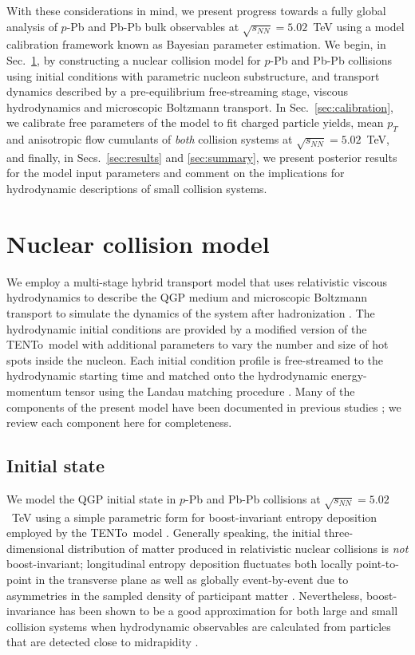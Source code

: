 \documentclass[aps,prc,reprint,amsmath,nofootinbib]{revtex4-1}
\newcommand{\trento}{T\raisebox{-0.5ex}{R}ENTo}
\newcommand{\sqrts}{\sqrt{s_{NN}}}
\begin{document}
With these considerations in mind, we present progress towards a fully global analysis of $p$-Pb and Pb-Pb bulk observables at $\sqrts=5.02$~TeV using a model calibration framework known as Bayesian parameter estimation.
We begin, in Sec.~\ref{sec:model}, by constructing a nuclear collision model for $p$-Pb and Pb-Pb collisions using initial conditions with parametric nucleon substructure, and transport dynamics described by a pre-equilibrium free-streaming stage, viscous hydrodynamics and microscopic Boltzmann transport.
In Sec.~\ref{sec:calibration}, we calibrate free parameters of the model to fit charged particle yields, mean $p_T$ and anisotropic flow cumulants of \emph{both} collision systems at $\sqrts=5.02$~TeV, and finally, in Secs.~\ref{sec:results} and \ref{sec:summary}, we present posterior results for the model input parameters and comment on the implications for hydrodynamic descriptions of small collision systems.


\section{Nuclear collision model}
\label{sec:model}

We employ a multi-stage hybrid transport model that uses relativistic viscous hydrodynamics to describe the QGP medium and microscopic Boltzmann transport to simulate the dynamics of the system after hadronization \cite{Shen:2014vra, Bernhard:2016tnd}.
The hydrodynamic initial conditions are provided by a modified version of the \trento\ model \cite{Moreland:2014oya} with additional parameters to vary the number and size of hot spots inside the nucleon.
Each initial condition profile is free-streamed to the hydrodynamic starting time and matched onto the hydrodynamic energy-momentum tensor using the Landau matching procedure \cite{Broniowski:2008qk, Heinz:2015arc}.
Many of the components of the present model have been documented in previous studies \cite{Moreland:2014oya, Bernhard:2016tnd, Bernhard:2018hnz}; we review each component here for completeness.

\subsection{Initial state}
\label{sec:initial_state}

We model the QGP initial state in $p$-Pb and Pb-Pb collisions at $\sqrts=5.02$~TeV using a simple parametric form for boost-invariant entropy deposition employed by the \trento\ model \cite{Moreland:2014oya}.
Generally speaking, the initial three-dimensional distribution of matter produced in relativistic nuclear collisions is \emph{not} boost-invariant; longitudinal entropy deposition fluctuates both locally point-to-point in the transverse plane as well as globally event-by-event due to asymmetries in the sampled density of participant matter \cite{Ke:2016jrd, Bozek:2010vz}.
Nevertheless, boost-invariance has been shown to be a good approximation for both large and small collision systems when hydrodynamic observables are calculated from particles that are detected close to midrapidity \cite{Shen:2016zpp}.
\end{document}
